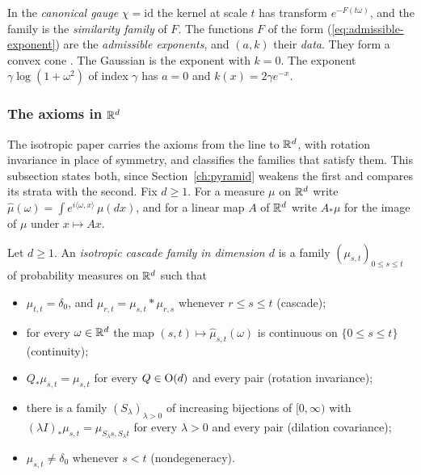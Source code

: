 In the \emph{canonical gauge} $\chi = \mathrm{id}$ the kernel at scale $t$ has transform
$e^{-F(t\omega)}$, and the family is the \emph{similarity family} of $F$. The functions $F$ of the
form (\ref{eq:admissible-exponent}) are the \emph{admissible exponents}, and $(a, k)$ their
\emph{data}. They form a convex cone . The Gaussian is the
exponent with $k = 0$. The \Matern{} exponent $\gamma\log(1 + \omega^2)$ of index $\gamma$ has
$a = 0$ and $k(x) = 2\gamma e^{-x}$.

\subsubsection{The axioms in $\mathbb{R}^d$}
\label{subsec:cited-d}

The isotropic paper carries the axioms from the line to $\mathbb{R}^d$, with rotation invariance in place
of symmetry, and classifies the families that satisfy them. This subsection states both, since
Section~\ref{ch:pyramid} weakens the first and compares its strata with the second. Fix $d \ge 1$.
For a measure $\mu$ on $\mathbb{R}^d$ write
$\widehat\mu(\omega) = \int e^{i\langle\omega, x\rangle}\,\mu(dx)$, and for a linear map $A$ of
$\mathbb{R}^d$ write $A_*\mu$ for the image of $\mu$ under $x \mapsto Ax$.

\begin{definition}
\label{def:isotropic-cascade-family}

Let $d \ge 1$. An \emph{isotropic cascade family in dimension $d$} is a family
$(\mu_{s,t})_{0 \le s \le t}$ of probability measures on $\mathbb{R}^d$ such that
\begin{itemize}
\item[(I1)] $\mu_{t,t} = \delta_0$, and $\mu_{r,t} = \mu_{s,t} * \mu_{r,s}$ whenever
$r \le s \le t$ (cascade);
\item[(I2)] for every $\omega \in \mathbb{R}^d$ the map $(s,t) \mapsto \widehat\mu_{s,t}(\omega)$ is
continuous on $\{0 \le s \le t\}$ (continuity);
\item[(I3)] $Q_*\mu_{s,t} = \mu_{s,t}$ for every $Q \in \mathrm{O}(d)$ and every pair (rotation
invariance);
\item[(I4)] there is a family $(S_\lambda)_{\lambda > 0}$ of increasing bijections of
$[0,\infty)$ with $(\lambda I)_*\mu_{s,t} = \mu_{S_\lambda s, S_\lambda t}$ for every $\lambda > 0$
and every pair (dilation covariance);
\item[(ND)] $\mu_{s,t} \ne \delta_0$ whenever $s < t$ (nondegeneracy).
\end{itemize}
\end{definition}

